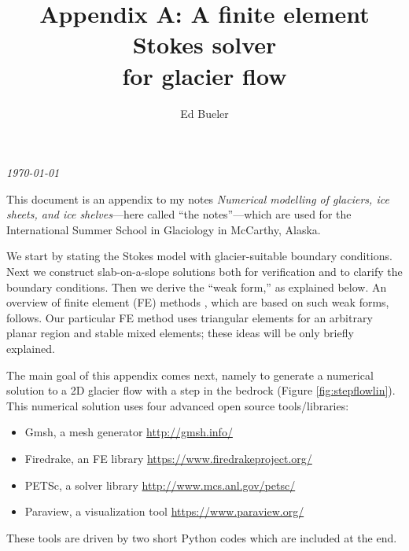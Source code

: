 \documentclass[letterpaper,final,12pt,reqno]{amsart}
\begin{document}
\graphicspath{{figures/}}

\title[Appendix A: A finite element Stokes solver for glacier flow]{Appendix A: A finite element Stokes solver \\ for glacier flow}

\author{Ed Bueler}

\maketitle

\vspace{-8mm}
\begin{center}
\footnotesize
\emph{\today}
\end{center}

\bigskip

\renewcommand{\theequation}{A\arabic{equation}}

This document is an appendix to my notes \emph{Numerical modelling of glaciers, ice sheets, and ice shelves}---here called ``the notes''---which are used for the International Summer School in Glaciology in McCarthy, Alaska.

We start by stating the Stokes model with glacier-suitable boundary conditions.  Next we construct slab-on-a-slope solutions both for verification and to clarify the boundary conditions.  Then we derive the ``weak form,'' as explained below.  An overview of finite element (FE) methods \cite{Elmanetal2014}, which are based on such weak forms, follows.  Our particular FE method uses triangular elements for an arbitrary planar region and stable mixed elements; these ideas will be only briefly explained.

The main goal of this appendix comes next, namely to generate a numerical solution to a 2D glacier flow with a step in the bedrock (Figure \ref{fig:stepflowlin}).  This numerical solution uses four advanced open source tools/libraries:
\begin{itemize}
\item Gmsh, a mesh generator \hfill \url{http://gmsh.info/}
\item Firedrake, an FE library \hfill \url{https://www.firedrakeproject.org/}
\item PETSc, a solver library \hfill \url{http://www.mcs.anl.gov/petsc/}
\item Paraview, a visualization tool \hfill \url{https://www.paraview.org/}
\end{itemize}
These tools are driven by two short Python codes which are included at the end.
\end{document}
